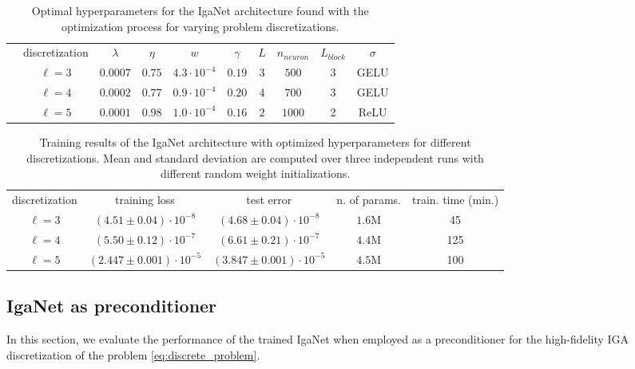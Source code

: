 \documentclass{article}
\newcommand{\reflevel}{\ell} %
\theoremstyle{plain}
\numberwithin{equation}{section}
\begin{document}
\begin{table}[!ht]
    \centering
    \begin{tabular}{cccccccccc}
        \toprule
         & discretization & $\lambda$ & $\eta$ & $w$                & $\gamma$ & $L$ & $n_{neuron}$ & $L_{block}$ & $\sigma$ \\
        \cmidrule{1-10}
         & $\reflevel=3$  & $0.0007$  & $0.75$ & $4.3\cdot 10^{-4}$ & $0.19$   & $3$ & $500$        & 3           & GELU     \\
         & $\reflevel=4$  & $0.0002$  & $0.77$ & $0.9\cdot 10^{-4}$ & $0.20$   & $4$ & $700$        & 3           & GELU     \\
         & $\reflevel=5$  & $0.0001$  & $0.98$ & $1.0\cdot 10^{-4}$ & $0.16$   & $2$ & $1000$       & 2           & ReLU     \\
        \bottomrule
    \end{tabular}
    \caption{Optimal hyperparameters for the IgaNet architecture found with the optimization process for varying problem discretizations.}
    \label{table:fixed_rhs_ray_hyperparams_A}
\end{table}
\begin{table}[!ht]
    \centering
    \begin{tabular}{ccccc}
        \toprule
        discretization & training loss                    & test error                       & n. of params. & train. time (min.) \\
        \cmidrule{1-5}
        $\reflevel=3$  & $(4.51 \pm 0.04)\cdot 10^{-8}$   & $(4.68 \pm 0.04)\cdot 10^{-8}$   & $1.6$M        & 45                   \\
        $\reflevel=4$  & $(5.50 \pm 0.12)\cdot 10^{-7}$   & $(6.61 \pm 0.21)\cdot 10^{-7}$   & $4.4$M        & 125                  \\
        $\reflevel=5$  & $(2.447 \pm 0.001)\cdot 10^{-5}$ & $(3.847 \pm 0.001)\cdot 10^{-5}$ & $4.5$M        & 100                  \\
        \bottomrule
    \end{tabular}
    \caption{Training results of the IgaNet architecture with optimized hyperparameters for different discretizations. Mean and standard deviation are computed over three independent runs with different random weight initializations.}
    \label{table:fixed_rhs_results_A}
\end{table}

\subsection{IgaNet as preconditioner}
In this section, we evaluate the performance of the trained IgaNet when employed as a preconditioner for the high-fidelity IGA discretization of the problem \eqref{eq:discrete_problem}.
\end{document}
